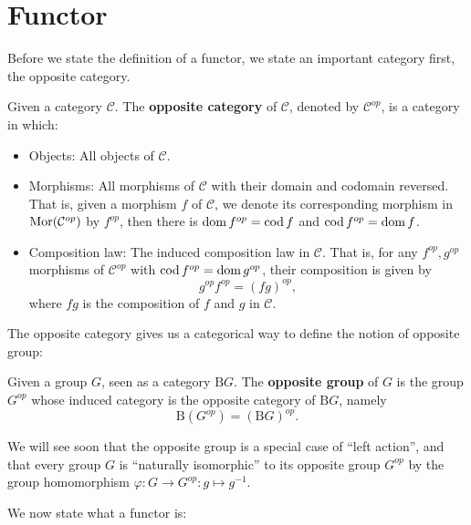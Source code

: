 \section{Functor}
Before we state the definition of a functor, we state an important category first, the opposite category.
	\begin{definition}
	Given a category $\mathcal{C}$. The \textbf{opposite category} of $\mathcal{C}$, denoted by $\mathcal{C}^{op}$, is a category in which:
		\begin{itemize}
			\item Objects: All objects of $\mathcal{C}$.
			\item Morphisms: All morphisms of $\mathcal{C}$ with their domain and codomain reversed. That is, given a morphism $f$ of $\mathcal{C}$, we denote its corresponding morphism in $\operatorname{Mor}(\mathcal{C}^{op})$ by $f^{op}$, then there is $\operatorname{dom} f^{op}=\operatorname{cod} f$ and $\operatorname{cod} f^{op}=\operatorname{dom} f$.
				\item Composition law: The induced composition law in $\mathcal{C}$. That is, for any $f^{op},g^{op}$ morphisms of $\mathcal{C}^{op}$ with $\operatorname{cod} f^{op}=\operatorname{dom} g^{op}$, their composition is given by
			\[g^{op}f^{op}=(fg)^{op},\]
		where $fg$ is the composition of $f$ and $g$ in $\mathcal{C}$. 
		\end{itemize}
	\end{definition}
	The opposite category gives us a categorical way to define the notion of opposite group:
	\begin{definition}
	Given a group $G$, seen as a category $\mathrm{B}G$. The \textbf{opposite group} of $G$ is the group $G^{op}$ whose induced category is the opposite category of $\mathrm{B}G$, namely
	\[\mathrm{B}(G^{op})=(\mathrm{B}G)^{op}.\]
	\end{definition}
	We will see soon that the opposite group is a special case of ``left action'', and that every group $G$ is ``naturally isomorphic'' to its opposite group $G^{op}$ by the group homomorphism $\varphi:G\to G^{op}:g\mapsto g^{-1}$. \par
	We now state what a functor is:
